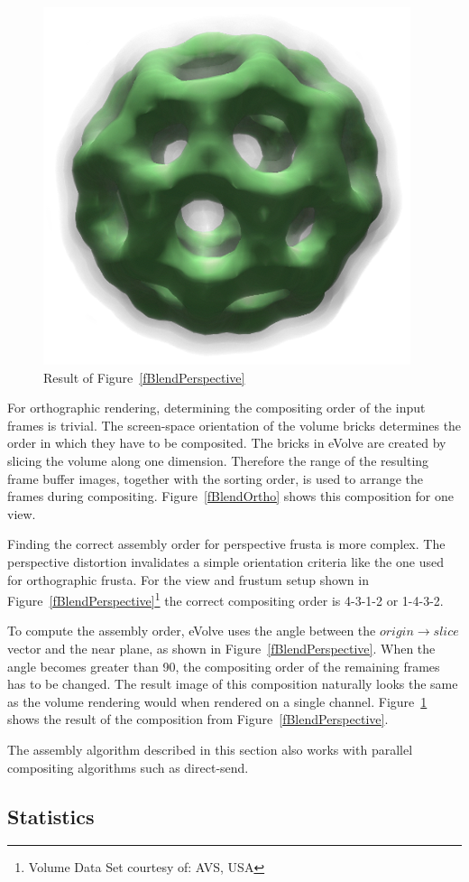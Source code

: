 \documentclass[10pt,a4]{scrartcl}
\newcommand{\fig}[1]{Figure~\ref{#1}}
\begin{document}
\begin{figure}
  \includegraphics[width=.382\textwidth]{images/volResult.png}
  {\caption{\small\label{fVolResult}Result of \fig{fBlendPerspective}}}
\end{figure}
For orthographic rendering, determining the compositing order of the
input frames is trivial. The screen-space orientation of the volume
bricks determines the order in which they have to be composited. The
bricks in \textsf{eVolve} are created by slicing the volume along one
dimension. Therefore the range of the resulting frame buffer images,
together with the sorting order, is used to arrange the frames during
compositing. \fig{fBlendOrtho} shows this composition for one view.

Finding the correct assembly order for perspective frusta is more
complex. The perspective distortion invalidates a simple orientation
criteria like the one used for orthographic frusta. For the view and
frustum setup shown in \fig{fBlendPerspective}\footnote{Volume Data Set
  courtesy of: AVS, USA} the correct compositing order is 4-3-1-2 or
1-4-3-2.

To compute the assembly order, \textsf{eVolve} uses the angle between
the $origin \rightarrow slice$ vector and the near plane, as shown in
\fig{fBlendPerspective}. When the angle becomes greater than
90\textdegree, the compositing order of the remaining frames has to be
changed. The result image of this composition naturally looks the same
as the volume rendering would when rendered on a single
channel. \fig{fVolResult} shows the result of the composition from
\fig{fBlendPerspective}.

The assembly algorithm described in this section also works with parallel
compositing algorithms such as direct-send. 


\subsection{\label{sStatistics}Statistics}
\end{document}
